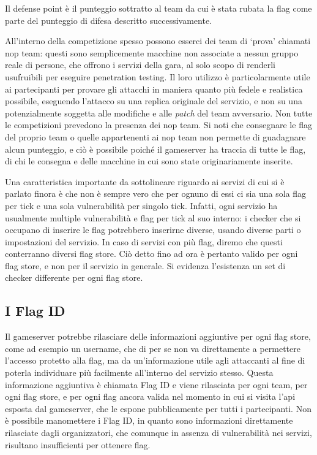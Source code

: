 Il defense point è il punteggio sottratto al team da cui è stata rubata la flag come parte del punteggio di difesa descritto successivamente.

All'interno della competizione spesso possono esserci dei team di `prova' chiamati \gls{nop} team: questi sono semplicemente macchine non associate a nessun gruppo reale di persone, che offrono i servizi della gara, al solo scopo di renderli usufruibili per eseguire penetration testing. Il loro utilizzo è particolarmente utile ai partecipanti per provare gli attacchi in maniera quanto più fedele e realistica possibile, eseguendo l'attacco su una replica originale del servizio, e non su una potenzialmente soggetta alle modifiche e alle \textit{patch} del team avversario. Non tutte le competizioni prevedono la presenza dei \gls{nop} team.
Si noti che consegnare le flag del proprio team o quelle appartenenti ai \gls{nop} team non permette di guadagnare alcun punteggio, e ciò è possibile poiché il gameserver ha traccia di tutte le flag, di chi le consegna e delle macchine in cui sono state originariamente inserite.

Una caratteristica importante da sottolineare riguardo ai servizi di cui si è parlato finora è che non è sempre vero che per ognuno di essi ci sia una sola flag per tick e una sola vulnerabilità per singolo tick. Infatti, ogni servizio ha usualmente multiple vulnerabilità e flag per tick al suo interno: i checker che si occupano di inserire le flag potrebbero inserirne diverse, usando diverse parti o impostazioni del servizio.
In caso di servizi con più flag, diremo che questi conterranno diversi flag store. Ciò detto fino ad ora è pertanto valido per ogni flag store, e non per il servizio in generale. Si evidenza l'esistenza un set di checker differente per ogni flag store.

\subsection{I Flag ID}

Il gameserver potrebbe rilasciare delle informazioni aggiuntive per ogni flag store, come ad esempio un username, che di per se non va direttamente a permettere l'accesso protetto alla flag, ma da un'informazione utile agli attaccanti al fine di poterla individuare più facilmente all'interno del servizio stesso.
Questa informazione aggiuntiva è chiamata Flag ID e viene rilasciata per ogni team, per ogni flag store, e per ogni flag ancora valida nel momento in cui si visita l'\gls{api} esposta dal gameserver, che le espone pubblicamente per tutti i partecipanti. Non è possibile manomettere i Flag ID, in quanto sono informazioni direttamente rilasciate dagli organizzatori, che comunque in assenza di vulnerabilità nei servizi, risultano insufficienti per ottenere flag.

